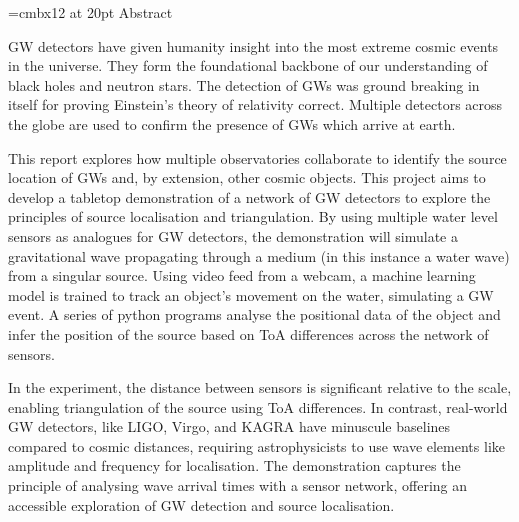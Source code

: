 \font\myfont=cmbx12 at 20pt
\Large
{\myfont Abstract}

\ac{GW} detectors have given humanity insight into the most extreme cosmic events in the universe. They form the foundational backbone of our understanding of black holes and neutron stars. The detection of GWs was ground breaking in itself for proving Einstein's theory of relativity correct. Multiple detectors across the globe are used to confirm the presence of GWs which arrive at earth.

This report explores how multiple observatories collaborate to identify the source location of GWs and, by extension, other cosmic objects. This project aims to develop a tabletop demonstration of a network of GW detectors to explore the principles of source localisation and triangulation. By using multiple water level sensors as analogues for GW detectors, the demonstration will simulate a gravitational wave propagating through a medium (in this instance a water wave) from a singular source. Using video feed from a webcam, a machine learning model is trained to track an object's movement on the water, simulating a GW event. A series of python programs analyse the positional data of the object and infer the position of the source based on \ac{ToA} differences across the network of sensors. 

In the experiment, the distance between sensors is significant relative to the scale, enabling triangulation of the source using ToA differences. In contrast, real-world GW detectors, like LIGO, Virgo, and KAGRA have minuscule baselines compared to cosmic distances, requiring astrophysicists to use wave elements like amplitude and frequency for localisation. The demonstration captures the principle of analysing wave arrival times with a sensor network, offering an accessible exploration of GW detection and source localisation.